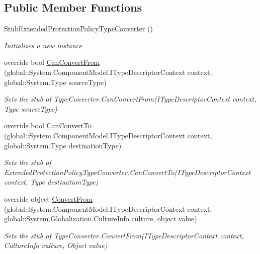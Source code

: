\subsection*{Public Member Functions}
\begin{DoxyCompactItemize}
\item 
\hyperlink{class_system_1_1_security_1_1_authentication_1_1_extended_protection_1_1_fakes_1_1_stub_extendedf67afed15bbc0df07bfc91316f6f81f0_a2d63d94f4d71c2568618339c328fbb8b}{Stub\-Extended\-Protection\-Policy\-Type\-Converter} ()
\begin{DoxyCompactList}\small\item\em Initializes a new instance\end{DoxyCompactList}\item 
override bool \hyperlink{class_system_1_1_security_1_1_authentication_1_1_extended_protection_1_1_fakes_1_1_stub_extendedf67afed15bbc0df07bfc91316f6f81f0_ae52e37495bd9c2d9cca19933415ed774}{Can\-Convert\-From} (global\-::\-System.\-Component\-Model.\-I\-Type\-Descriptor\-Context context, global\-::\-System.\-Type source\-Type)
\begin{DoxyCompactList}\small\item\em Sets the stub of Type\-Converter.\-Can\-Convert\-From(\-I\-Type\-Descriptor\-Context context, Type source\-Type)\end{DoxyCompactList}\item 
override bool \hyperlink{class_system_1_1_security_1_1_authentication_1_1_extended_protection_1_1_fakes_1_1_stub_extendedf67afed15bbc0df07bfc91316f6f81f0_aa5e9235f051339d8c9e6c385b2b1438a}{Can\-Convert\-To} (global\-::\-System.\-Component\-Model.\-I\-Type\-Descriptor\-Context context, global\-::\-System.\-Type destination\-Type)
\begin{DoxyCompactList}\small\item\em Sets the stub of Extended\-Protection\-Policy\-Type\-Converter.\-Can\-Convert\-To(\-I\-Type\-Descriptor\-Context context, Type destination\-Type)\end{DoxyCompactList}\item 
override object \hyperlink{class_system_1_1_security_1_1_authentication_1_1_extended_protection_1_1_fakes_1_1_stub_extendedf67afed15bbc0df07bfc91316f6f81f0_acf65d49f8124ab2d39a4746d22b114d6}{Convert\-From} (global\-::\-System.\-Component\-Model.\-I\-Type\-Descriptor\-Context context, global\-::\-System.\-Globalization.\-Culture\-Info culture, object value)
\begin{DoxyCompactList}\small\item\em Sets the stub of Type\-Converter.\-Convert\-From(\-I\-Type\-Descriptor\-Context context, Culture\-Info culture, Object value)\end{DoxyCompactList}\item 

\end{DoxyCompactItemize}
